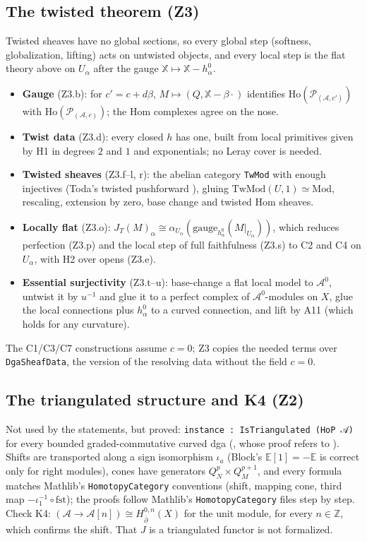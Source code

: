 \documentclass[11pt,a4paper]{article}
\newcommand{\code}[1]{\texttt{#1}}
\newcommand{\cA}{\mathcal{A}}
\newcommand{\dbar}{\bar\partial}
\newcommand{\Ho}{\mathrm{Ho}}
\newcommand{\X}{\mathbb{X}}
\begin{document}
\subsection{The twisted theorem (Z3)}\label{sec:tw-proof}
Twisted sheaves have no global sections, so every global step (softness, globalization, lifting)
acts on untwisted objects, and every local step is the flat theory above on $U_\alpha$ after the
gauge $\X\mapsto\X-h^0_\alpha$.
\begin{itemize}
\item \textbf{Gauge} (Z3.b): for $c'=c+d\beta$, $M\mapsto(Q,\X-\beta\cdot)$ identifies
$\Ho(\mathcal P_{(\cA,c')})$ with $\Ho(\mathcal P_{(\cA,c)})$; the Hom complexes agree on the nose.
\item \textbf{Twist data} (Z3.d): every closed $h$ has one, built from local primitives given by H1
in degrees $2$ and $1$ and exponentials; no Leray cover is needed.
\item \textbf{Twisted sheaves} (Z3.f--l, r): the abelian category \code{TwMod} with enough
injectives (Toda's twisted pushforward \cite[Lemma~4.3]{Toda}), gluing $\mathrm{TwMod}(U,1)\simeq\mathrm{Mod}$, rescaling,
extension by zero, base change and twisted Hom sheaves.
\item \textbf{Locally flat} (Z3.o): $J_T(M)_\alpha\cong\alpha_{U_\alpha}(\mathrm{gauge}_{h^0_\alpha}(M|_{U_\alpha}))$,
which reduces perfection (Z3.p) and the local step of full faithfulness (Z3.s) to C2 and C4 on
$U_\alpha$, with H2 over opens (Z3.e).
\item \textbf{Essential surjectivity} (Z3.t--u): base-change a flat local model to $\cA^0$, untwist it
by $u^{-1}$ and glue it to a perfect complex of $\cA^0$-modules on $X$, glue the local connections
plus $h^0_\alpha$ to a curved connection, and lift by A11 (which holds for any curvature).
\end{itemize}
The C1/C3/C7 constructions assume $c=0$; Z3 copies the needed terms over \code{DgaSheafData}, the
version of the resolving data without the field $c=0$.

\subsection{\texorpdfstring{The triangulated structure and K4 (Z2)}{The triangulated structure and K4 (Z2)}}\label{sec:tr}
Not used by the statements, but proved: \code{instance : IsTriangulated (HoP 𝒜)} for every
bounded graded-commutative curved dga (\cite[Prop~2.4.1]{B}, whose proof refers to \cite[Props~1--2]{BK}).
Shifts are transported along a sign isomorphism $\iota_a$ (Block's $\mathbb E[1]=-\mathbb E$ is
correct only for right modules), cones have generators $Q_N^p\times Q_M^{p+1}$, and every formula
matches Mathlib's \code{HomotopyCategory} conventions (shift, mapping cone, third map
$-\iota_1^{-1}\circ\mathrm{fst}$); the proofs follow Mathlib's \code{HomotopyCategory} files step
by step. Check K4: $(\cA\to\cA[n])\cong H^{0,n}_{\dbar}(X)$ for the unit module, for every
$n\in\mathbb Z$, which confirms the shift. That $J$ is a triangulated functor is not formalized.
\end{document}
